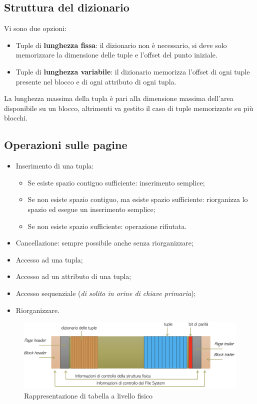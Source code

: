 \documentclass[oneside,a4paper,11pt]{book}
\theoremstyle{italicstyle}
\theoremstyle{normStyle}
\begin{document}
\subsection{Struttura del dizionario}
Vi sono due opzioni:
\begin{itemize}
    \item Tuple di \textbf{lunghezza fissa}: il dizionario non è necessario, 
    si deve solo memorizzare la dimensione delle tuple e l'offset del punto iniziale.
    \item Tuple di \textbf{lunghezza variabile}: il dizionario memorizza l'offset di ogni 
    tuple presente nel blocco e di ogni attributo di ogni tupla.
\end{itemize}
La lunghezza massima della tupla è pari alla dimensione massima dell'area disponibile su un blocco,
altrimenti va gestito il caso di tuple memorizzate su più blocchi.
\subsection{Operazioni sulle pagine}
\begin{itemize}
    \item Inserimento di una tupla:
    \begin{itemize}
        \item Se esiste spazio contiguo sufficiente: inserimento semplice;
        \item Se non esiste spazio contiguo, ma esiste spazio sufficiente: riorganizza 
        lo spazio ed esegue un inserimento semplice;
        \item Se non esiste spazio sufficiente: operazione rifiutata.
    \end{itemize}
    \item Cancellazione: sempre possibile anche senza riorganizzare;
    \item Accesso ad una tupla;
    \item Accesso ad un attributo di una tupla;
    \item Accesso sequenziale (\textit{di solito in orine di chiave primaria});
    \item Riorganizzare.
\end{itemize}
\begin{figure}[H]
    \centering
    \includegraphics[width=15cm]{img/Tabella_livello_fisico.png}
    \caption{Rappresentazione di tabella a livello fisico}
    \label{fig:tab_liv_fis}
\end{figure}
\end{document}

